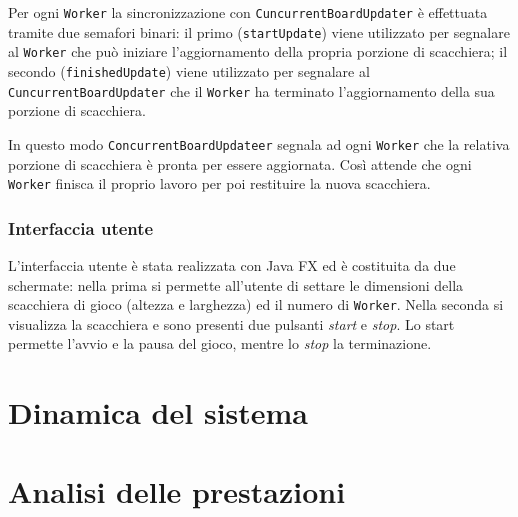 \documentclass[a4paper]{article}
\begin{document}
Per ogni \texttt{Worker} la sincronizzazione con
\texttt{CuncurrentBoardUpdater} è effettuata tramite due semafori
binari: il primo (\texttt{startUpdate}) viene utilizzato per segnalare al \texttt{Worker} che può iniziare l'aggiornamento della propria
porzione di scacchiera; il secondo (\texttt{finishedUpdate}) viene
utilizzato per segnalare al \texttt{CuncurrentBoardUpdater} che il
\texttt{Worker} ha terminato l'aggiornamento della sua porzione di
scacchiera.

In questo modo \texttt{ConcurrentBoardUpdateer} segnala ad ogni
\texttt{Worker} che la relativa porzione di scacchiera è pronta per
essere aggiornata. Così attende che ogni \texttt{Worker} finisca il
proprio lavoro per poi restituire la nuova scacchiera.

\subsubsection{Interfaccia utente}\label{interfaccia-utente}

L'interfaccia utente è stata realizzata con Java FX ed è costituita da due schermate: nella prima si permette all'utente di settare le
dimensioni della scacchiera di gioco (altezza e larghezza) ed il numero di \texttt{Worker}. Nella seconda si visualizza la scacchiera e sono
presenti due pulsanti \emph{start} e \emph{stop}. Lo start permette
l'avvio e la pausa del gioco, mentre lo \emph{stop} la terminazione.

\section{Dinamica del sistema}\label{dinamica-del-sistema}

\section{Analisi delle prestazioni}\label{analisi-delle-prestazioni}

\end{document}
